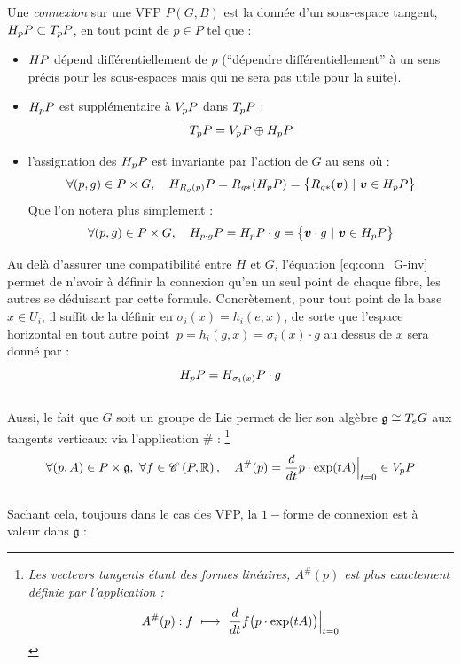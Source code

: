 \begin{definition} \label{def:connexion2VFP}
	Une \emph{connexion} sur une VFP $P(G,B)$ est la donnée d'un sous-espace tangent, $\hg[p]{P}\subset \tg[p]{P}$, en tout point de $p\in P$ tel que :
	\begin{itemize}
		
		\item $\hg{P}$ dépend différentiellement de $p$ (``dépendre différentiellement'' à un sens précis pour les sous-espaces mais qui ne sera pas utile pour la suite).
		
		\item $\hg[p]{P}$ est supplémentaire à $\vg[p]{P}$ dans $\tg[p]{P}$ :
		\begin{equation}\label{eq:TP=V+H}
			\tg[p]{P} = \vg[p]{P} \oplus \hg[p]{P}
		\end{equation}
		
		\item l'assignation des $\hg[p]{P}$ est invariante par l'action de $G$ au sens où :
		\begin{equation}\label{eq:conn_G-inv}
			\forall (p,g)\in P\times G,\quad \hg[R_g(p)]{P} = R_{g*} (\hg[p]{P}) = \big\{R_{g*}(\bf{v})\ |\ \bf{v} \in \hg[p]{P} \big\}
		\end{equation}
		Que l'on notera plus simplement :
		\begin{equation}
		\forall (p,g)\in P\times G,\quad \hg[p\cdot g]{P} = \hg[p]{P}\cdot g = \big\{\bf{v}\cdot g\ |\ \bf{v} \in \hg[p]{P} \big\}
		\end{equation}
	\end{itemize}
\end{definition}
\skipl

Au delà d'assurer une compatibilité entre $H$ et $G$, l'équation \eqref{eq:conn_G-inv} permet de n'avoir à définir la connexion qu'en un seul point de chaque fibre, les autres se déduisant par cette formule. 
Concrètement, pour tout point de la base $x\in U_i$, il suffit de la définir en $\sigma_i(x) = h_i(e, x)$, de sorte que l'espace horizontal en tout autre point $\ p=h_i(g, x) = \sigma_i(x)\cdot g$ au dessus de $x$ sera donné par :
\[\hg[p]{P} = \hg[\sigma_i(x)]{P}\cdot g\]
\\
Aussi, le fait que $G$ soit un groupe de Lie permet de lier son algèbre $\mathfrak{g}\cong \tg[e]{G}$ aux tangents verticaux via l'application $\#$ : \footnote{\itshape 
	Les vecteurs tangents étant des formes linéaires, $A^\#(p)$ est plus exactement définie par l'application :
	\[A^\#(p) : f\ \lmt\  \frac{d}{dt} f\big( p\cdot \exp(tA) \big)\Big|_{t=0}\]}
\begin{equation} \label{eq:alg2vg}
	\forall (p,A)\in P\times \mathfrak{g},\ \forall f\in\conti{P}{\R},\quad A^\#(p) = \frac{d}{dt} p\cdot \exp(tA) \Big|_{t=0}\in\vg[p]{P}
\end{equation}
\\
Sachant cela, toujours dans le cas des VFP, la $1-$forme de connexion est à valeur dans $\mathfrak{g}$ :

